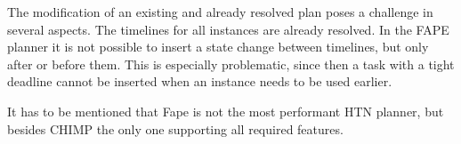 The modification of an existing and already resolved plan poses a challenge in several aspects.
The timelines for all instances are already resolved.
In the FAPE planner it is not possible to insert a state change between timelines, but only after or before them.
This is especially problematic, since then a task with a tight deadline cannot be inserted when an instance needs to be used earlier.


It has to be mentioned that Fape is not the most performant HTN planner, but besides CHIMP the only one supporting all required features.